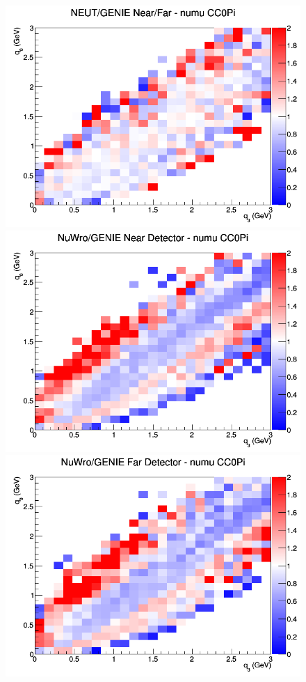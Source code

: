 \documentclass[12pt]{article}
\begin{document}
\begin{figure}[h]
\endminipage
{}
\includegraphics[width=\linewidth]{eff_q0_q3/GAr/ratios/CC0Pi_NEUT_GENIE_numu_NF_q3_q0.png}
\endminipage
\newline
{}
\includegraphics[width=\linewidth]{eff_q0_q3/GAr/ratios/CC0Pi_NuWro_GENIE_numu_near_q3_q0.png}
\endminipage
{}
\includegraphics[width=\linewidth]{eff_q0_q3/GAr/ratios/CC0Pi_NuWro_GENIE_numu_far_q3_q0.png}

\end{figure}
\end{document}
